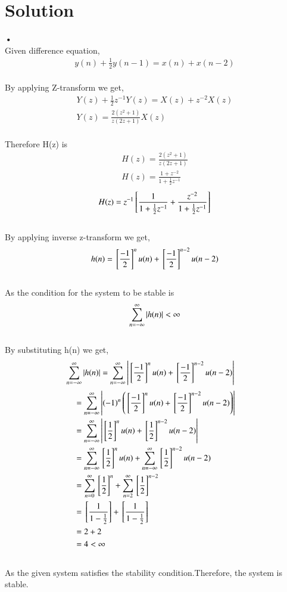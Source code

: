 \documentclass[journal,12pt,twocolumn]{IEEEtran}
\begin{document}
\section{Solution}
\textbf{•}
\\
Given difference equation,
\begin{align}
y(n)+\frac{1}{2}y(n-1) = x(n)+x(n-2) 
\end{align}\\
By applying Z-transform we get, \\
\begin{align}
Y(z) + \frac{1}{2}z^{-1}Y(z)=X(z) + z^{-2}X(z)\\
Y(z)=\frac{2(z^2+1)}{z(2z+1)}X(z)
\end{align}\\
Therefore H(z) is \\
\begin{align}
H(z) = \frac{2(z^2+1)}{z(2z+1)} \\
H(z) = \frac{1+z^{-2}}{1+\frac{1}{2}z^{-1}}
\end{align}
\begin{align}
H(z)= z^{-1}{}\left[\frac{1}{1+\frac{1}{2}z^{-1}} + \frac{z^{-2}}{1+\frac{1}{2}z^{-1}}\right]
\end{align}\\
By applying inverse z-transform we get,\\
\begin{align}
    h(n)={}\left[\frac{-1}{2}\right]^nu(n) + {}\left[\frac{-1}{2}\right]^{n-2}u(n-2)
\end{align}\\
As the condition for the system to be stable is
\begin{align}
\sum_{n=-\infty}^{\infty} \left\vert h(n)\right\vert < \infty
\end{align}\\
By substituting h(n) we get,\\
\begin{align}
\sum_{n=-\infty}^{\infty} \left\vert h(n)\right\vert &= \sum_{n=-\infty}^{\infty}\left\vert{}\left[\frac{-1}{2}\right]^nu(n) + {}\left[\frac{-1}{2}\right]^{n-2}u(n-2)\right\vert
\end{align}
\begin{align}
&= 
\sum_{n=-\infty}^{\infty}\left\vert(-1)^n \left( {}\left[\frac{-1}{2}\right]^nu(n) + {}\left[\frac{-1}{2}\right]^{n-2}u(n-2) \right)\right\vert  \\
&= 
\sum_{n=-\infty}^{\infty}\left\vert{}\left[\frac{1}{2}\right]^nu(n) + {}\left[\frac{1}{2}\right]^{n-2}u(n-2)\right\vert \\
&=
\sum_{n=-\infty}^{\infty}{}\left[\frac{1}{2}\right]^nu(n)+\sum_{n=-\infty}^{\infty}{}\left[\frac{1}{2}\right]^{n-2}u(n-2)\\
&=
\sum_{n=0}^{\infty}{}\left[\frac{1}{2}\right]^n+\sum_{n=2}^{\infty}{}\left[\frac{1}{2}\right]^{n-2}\\
&=
{}\left[\frac{1}{1-\frac{1}{2}}\right]+{}\left[\frac{1}{1-\frac{1}{2}}\right]\\
&=
2+2\\
&=
4 < \infty
\end{align}\\
As the given system satisfies the stability condition.Therefore, the system is stable.\\
\\
\end{document}
